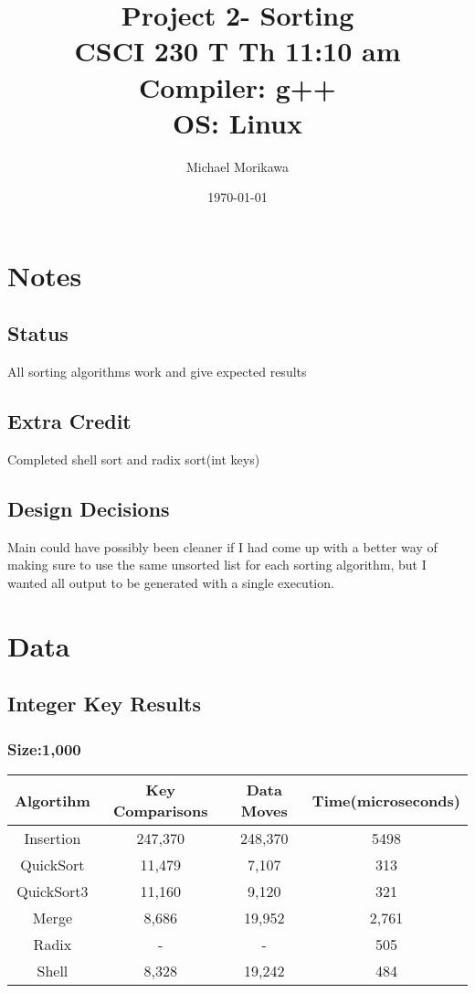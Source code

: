 \documentclass[titlepage]{article}
\title{
    Project 2- Sorting \\
    CSCI 230 T Th 11:10 am \\
    Compiler: g++ \\
    OS: Linux
    }
\author{Michael Morikawa}
\date{\today}
\begin{document}
\maketitle

\section{Notes}
\subsection{Status}
All sorting algorithms work and give expected results
\subsection{Extra Credit}
Completed shell sort and radix sort(int keys)
\subsection{Design Decisions}
Main could have possibly been cleaner if I had come up with a better way of making sure to use
the same unsorted list for each sorting algorithm, but I wanted all output to be generated with a
single execution.

\newpage

\section{Data}
\subsection{Integer Key Results}
\subsubsection{Size:1,000}
\begin{tabular}{|*{4}{c|}}
    \hline
    Algortihm  & Key Comparisons & Data Moves & Time(microseconds) \\
    \hline
    Insertion  & 247,370         & 248,370    & 5498               \\
    \hline
    QuickSort  & 11,479          & 7,107      & 313                \\
    \hline
    QuickSort3 & 11,160          & 9,120      & 321                \\
    \hline
    Merge      & 8,686           & 19,952     & 2,761              \\
    \hline
    Radix      & -               & -          & 505                \\
    \hline
    Shell      & 8,328           & 19,242     & 484                \\
    \hline
\end{tabular}
\end{document}
